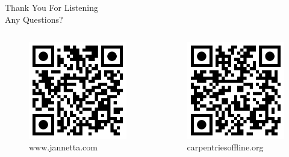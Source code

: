 \begin{frame}
	\frametitle{}
	\centering\LARGE Thank You For Listening \\
	\centering\LARGE Any Questions?
	\begin{columns}[b]
		\begin{column}[b]{.35\linewidth}
			\begin{figure}
				\includegraphics[width=.5\textwidth]{graphics/www.jannetta.com.png}
				\caption{www.jannetta.com}
			\end{figure}
		\end{column}
		\begin{column}[b]{.35\linewidth}
			\begin{figure}
				\includegraphics[width=.5\textwidth]{graphics/carpentriesoffline.org.png}
				\caption{carpentriesoffline.org}
			\end{figure}
		\end{column}
	\end{columns}
\end{frame}
